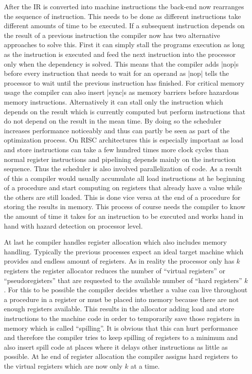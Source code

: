 After the IR is converted into machine instructions the back-end now rearranges the sequence of instruction.
This needs to be done as different instructions take different amounts of time to be executed.
If a subsequent instruction depends on the result of a previous instruction the compiler now has two alternative approaches to solve this.
First it can simply stall the programs execution as long as the instruction is executed and feed the next instruction into the processor only when the dependency is solved.
This means that the compiler adds |nop|s before every instruction that needs to wait for an operand as |nop| tells the processor to wait until the previous instruction has finished.
For critical memory usage the compiler can also insert |sync|s as memory barriers before hazardous memory instructions.
Alternatively it can stall only the instruction which depends on the result which is currently computed but perform instructions that do not depend on the result in the mean time.
By doing so the scheduler increases performance noticeably and thus can partly be seen as part of the optimization process.
On RISC architectures this is especially important as load and store instructions can take a few hundred times more clock cycles than normal register instructions and pipelining depends mainly on the instruction sequence.
Thus the scheduler is also involved parallelization of code.
As a result of this a compiler would usually accumulate all load instructions at he beginning of a procedure and start computing on registers that already have a value while the others are still loaded.
This is done vice versa at the end of a procedure for storing the results in memory.
This process of course needs the compiler to know the amount of time it takes for an instruction to be executed and works hand in hand with hazard detection on processor level.

At last he compiler handles register allocation which also includes memory handling.
Typically the previous processes expect an ideal target machine which provides and endless amount of registers.
As in reality the processor only has $k$ registers the register allocator reduces the number of ``virtual registers'' or ``pseudoregisters'' that are requested to the available number of ``hard registers'' $k$.
For this to be possible the compiler decides whether a value can live throughout a procedure in a register or must be placed into memory because there are not enough registers available.
This results in the allocator adding load and store instructions to the machine code in order to temporarily save those registers in memory which is called ``spilling''.
It is obvious that this can hurt performance and therefore the compiler tries to keep spilling of registers to a minimum and also insert spill code at places where it delays other instructions as little as possible.
At he end of register allocation the compiler assigns hard registers to the virtual registers which are now only $k$ at a time.

